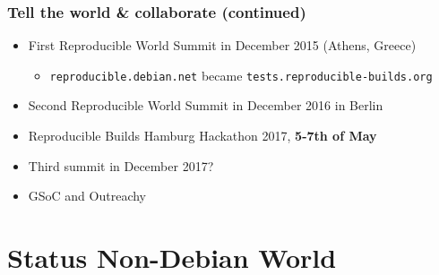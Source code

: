 \documentclass[14pt]{beamer}
\newif\ifplacelogo
\begin{document}
\begin{frame}
 \frametitle{Tell the world \& collaborate (continued)}

 \begin{itemize}
  \item First Reproducible World Summit in December 2015 (Athens, Greece)
   \begin{itemize}
    \item \texttt{reproducible.debian.net} became \texttt{tests.reproducible-builds.org}
   \end{itemize}
    \item Second Reproducible World Summit in December 2016 in Berlin
    \item Reproducible Builds Hamburg Hackathon 2017, \textbf{5-7th of May}
    \item Third summit in December 2017?
   \item<2> GSoC and Outreachy
 \end{itemize}
\end{frame}



\section{Status Non-Debian World}

\placelogofalse
\end{document}
